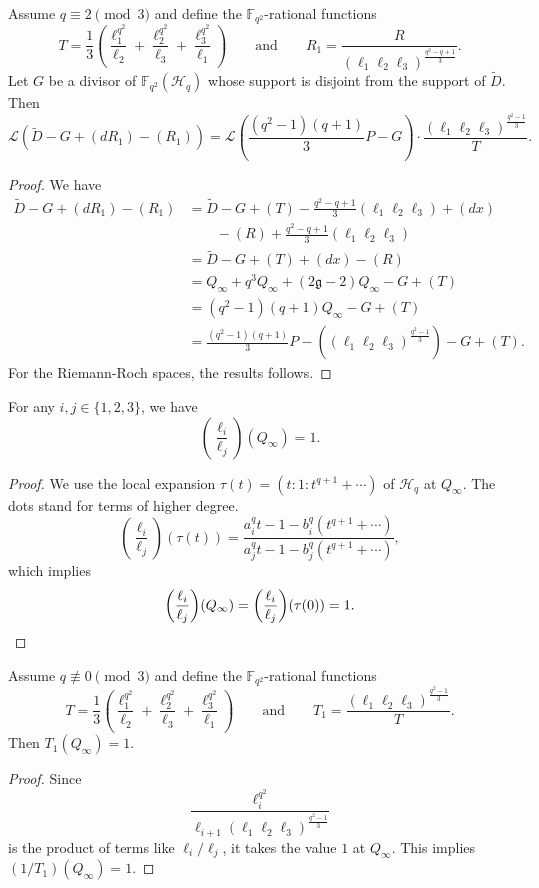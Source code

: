 \documentclass[entropy,article,submit,pdftex,moreauthors]{Definitions/mdpi}
\newcommand{\g}{\mathfrak{g}}
\begin{document}
\begin{Lemma} \label{lm:tildeD-riemann-roch}
Assume $q\equiv 2 \pmod3$ and define the $\mathbb{F}_{q^2}$-rational functions 
\[T=\frac{1}{3}\left(\frac{\ell_1^{q^2}}{\ell_2} + \frac{\ell_2^{q^2}}{\ell_3} + \frac{\ell_3^{q^2}}{\ell_1}\right) \qquad \text{and} \qquad R_1=\frac{R}{(\ell_1\ell_{2}\ell_{3})^{\frac{q^2-q+1}{3}}}.\]
Let $G$ be a divisor of $\mathbb{F}_{q^2}(\mathscr{H}_q)$ whose support is disjoint from the support of $\widetilde{D}$. Then
\[\mathscr{L}(\widetilde{D}-G+(dR_1)-(R_1)) = \mathscr{L}\left( \frac{(q^2-1)(q+1)}{3} P -  G\right) \cdot \frac{(\ell_1\ell_{2}\ell_{3})^{\frac{q^2-1}{3}}}{T}.\]
\end{Lemma}
\begin{proof}
We have
\begin{align*}
\widetilde{D}-G+(dR_1)-(R_1) &= \widetilde{D}-G+(T)-\frac{q^2-q+1}{3}(\ell_1\ell_2\ell_3)+(dx) \\
& \qquad -(R)+\frac{q^2-q+1}{3}(\ell_1\ell_2\ell_3) \\
&= \widetilde{D}-G+(T)+(dx)-(R)\\
&= Q_\infty + q^3 Q_\infty +(2\g-2)Q_\infty-G+(T)\\
&= (q^2-1)(q+1)Q_\infty -G+(T)\\
&= \frac{(q^2-1)(q+1)}{3}P-\left((\ell_1\ell_{2}\ell_{3})^{\frac{q^2-1}{3}}\right) -G+(T).
\end{align*}
For the Riemann-Roch spaces, the results follows. 
\end{proof}

\begin{Lemma} \label{lm:elliellj-at-Qinfty}
For any $i,j\in \{1,2,3\}$, we have
\[\left(\frac{\ell_i}{\ell_j}\right)(Q_\infty)=1.\]
\end{Lemma}
\begin{proof}
We use the local expansion $\tau(t)=(t:1:t^{q+1}+\cdots)$ of $\mathscr{H}_q$ at $Q_\infty$. The dots stand for terms of higher degree. 
\[\left(\frac{\ell_i}{\ell_j}\right)(\tau(t)) = \frac{a_i^qt -1 -b_i^q(t^{q+1}+\cdots)}{a_j^qt -1 -b_j^q(t^{q+1}+\cdots)},\] 
which implies 
\[\left(\frac{\ell_i}{\ell_j}\right)(Q_\infty) = \left(\frac{\ell_i}{\ell_j}\right)(\tau(0)) =1. \qedhere\]
\end{proof}

\begin{Lemma} \label{lm:T1-at-Qinfty}
Assume $q\not\equiv 0 \pmod3$ and define the $\mathbb{F}_{q^2}$-rational functions 
\[T=\frac{1}{3}\left(\frac{\ell_1^{q^2}}{\ell_2} + \frac{\ell_2^{q^2}}{\ell_3} + \frac{\ell_3^{q^2}}{\ell_1}\right) \qquad \text{and} \qquad T_1=\frac{(\ell_1\ell_{2}\ell_{3})^{\frac{q^2-1}{3}}}{T}.\]
Then $T_1(Q_\infty)=1$. 
\end{Lemma}
\begin{proof}
Since 
\[\frac{\ell_i^{q^2}}{\ell_{i+1}(\ell_1\ell_{2}\ell_{3})^{\frac{q^2-1}{3}}}\]
is the product of terms like $\ell_i/\ell_j$, it takes the value $1$ at $Q_\infty$. This implies $(1/T_1)(Q_\infty)=1$. 
\end{proof}
\end{document}
